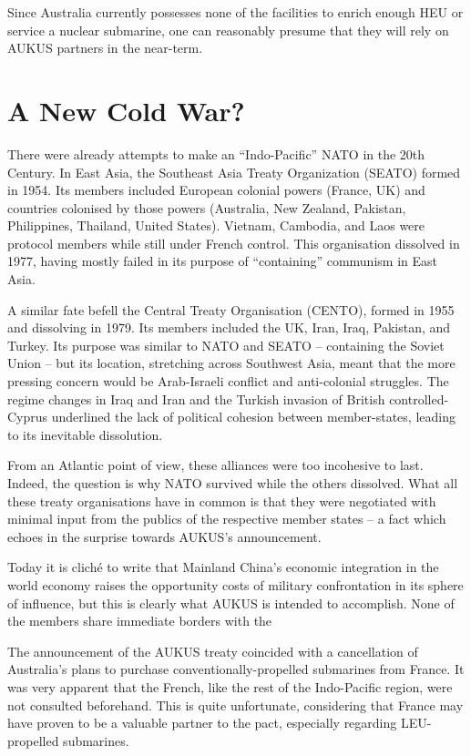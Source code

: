 \documentclass[letterpaper,12pt,twoside]{article} %
\begin{document}
\begin{multicols}{2}
Since Australia currently possesses none of the facilities to enrich enough HEU or service a nuclear submarine, one can reasonably presume that they will rely on AUKUS partners in the near-term.

\vfill
\pagebreak
\section{A New Cold War?}

There were already attempts to make an ``Indo-Pacific'' NATO in the 20th Century. In East Asia, the Southeast Asia Treaty Organization (SEATO) formed in 1954. Its members included European colonial powers (France, UK) and countries colonised by those powers (Australia, New Zealand, Pakistan, Philippines, Thailand, United States). Vietnam, Cambodia, and Laos were protocol members while still under French control. This organisation dissolved in 1977, having mostly failed in its purpose of ``containing'' communism in East Asia.

A similar fate befell the Central Treaty Organisation (CENTO), formed in 1955 and dissolving in 1979. Its members included the UK, Iran, Iraq, Pakistan, and Turkey. Its purpose was similar to NATO and SEATO -- containing the Soviet Union -- but its location, stretching across Southwest Asia, meant that the more pressing concern would be Arab-Israeli conflict and anti-colonial struggles. The regime changes in Iraq and Iran and the Turkish invasion of British controlled-Cyprus underlined the lack of political cohesion between member-states, leading to its inevitable dissolution.

From an Atlantic point of view, these alliances were too incohesive to last. Indeed, the question is why NATO survived while the others dissolved. What all these treaty organisations have in common is that they were negotiated with minimal input from the publics of the respective member states -- a fact which echoes in the surprise towards AUKUS's announcement.

Today it is cliché to write that Mainland China's economic integration in the world economy raises the opportunity costs of military confrontation in its sphere of influence, but this is clearly what AUKUS is intended to accomplish. None of the members share immediate borders with the

The announcement of the AUKUS treaty coincided with a cancellation of Australia's plans to purchase conventionally-propelled submarines from France. It was very apparent that the French, like the rest of the Indo-Pacific region, were not consulted beforehand. This is quite unfortunate, considering that France may have proven to be a valuable partner to the pact, especially regarding LEU-propelled submarines.


\end{multicols}
\end{document}

